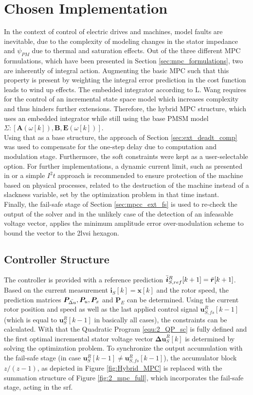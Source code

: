 \section{Chosen Implementation} \label{sec:chosen_impl}
In the context of control of electric drives and machines, model faults are inevitable, due to the complexity of modeling changes in the stator impedance and $\psi_{PM}$ due to thermal and saturation effects. Out of the three different MPC formulations, which have been presented in Section \ref{sec:mpc_formulations}, two are inherently of integral action. Augmenting the basic MPC such that this property is present by weighting the integral error prediction in the cost function leads to wind up effects. The embedded integrator according to L. Wang \cite{mpcWang} requires for the control of an incremental state space model which increases complexity and thus hinders further extensions. Therefore, the hybrid MPC structure, which uses an embedded integrator while still using the base PMSM model $\Sigma: \left[\bm{A}(\omega[k]),\bm{B},\bm{E}(\omega[k])\right]$.\\
Using that as a base structure, the approach of Section \ref{sec:ext_deadt_comp} was used to compensate for the one-step delay due to computation and modulation stage. Furthermore, the soft constraints were kept as a user-selectable option. For further implementations, a dynamic current limit, such as presented in \cite{TOMPFC1} or a simple $I^2t$ approach is recommended to ensure protection of the machine based on physical processes, related to the destruction of the machine instead of a slackness variable, set by the optimization problem in that time instant.\\
Finally, the fail-safe stage of Section \ref{sec:mpcc_ext_fs} is used to re-check the output of the solver and in the unlikely case of the detection of an infeasable voltage vector, applies the minimum amplitude error over-modulation scheme to bound the vector to the \acrshort{2lvsi} hexagon. 

\subsection{Controller Structure}
The controller is provided with a reference prediction $ \Bar{\bm i}^R_{S,ref}[k+1] = \Bar{\bm r}[k+1]$. Based on the current measurement $\bm{i}_S[k] = \bm{x}[k]$ and the rotor speed, the prediction matrices $\bm{P}_{\Bar{\Delta u}}, \bm{P}_u, \bm{P}_x$ and $\bm{P}_E$ can be determined. Using the current rotor position and speed as well as the last applied control signal $ \bm{u}^R_{S,fs}[k-1]$ (which is equal to $ \bm{u}^R_{S}[k-1]$ in basically all cases), the constraints can be calculated. With that the Quadratic Program \eqref{equ:2_QP_sc} is fully defined and the first optimal incremental stator voltage vector $\bm{\Delta u}_S^R[k]$ is determined by solving the optimization problem. To synchronize the output accumulation with the fail-safe stage (in case $\bm{u}^R_{S}[k-1] \neq \bm{u}^R_{S,fs}[k-1]$), the accumulator block $z/(z-1)$, as depicted in Figure \ref{fig:Hybrid_MPC} is replaced with the summation structure of Figure \ref{fig:2_mpc_full}, which incorporates the fail-safe stage, acting in the \acrshort{srf}.

